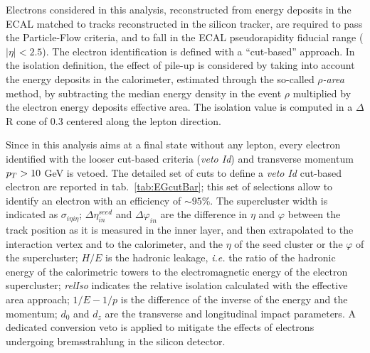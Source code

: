 Electrons considered in this analysis, reconstructed from energy deposits in the ECAL matched to tracks reconstructed in the silicon tracker, are required to pass the Particle-Flow criteria, and to fall in the ECAL pseudorapidity fiducial range ($|\eta|<2.5$). The electron identification is defined with a ``cut-based'' approach. In the isolation definition, the effect of pile-up is considered by taking into account the energy deposits in the calorimeter, estimated through the so-called \emph{$\rho$-area} method, by subtracting the median energy density in the event $\rho$ multiplied by the electron energy deposits effective area. The isolation value is computed in a $\Delta$R cone of 0.3 centered along the lepton direction.

\noindent Since in this analysis aims at a final state without any lepton, every electron identified with the looser cut-based criteria (\emph{veto Id}) and transverse momentum $p_T > 10$ GeV is vetoed. The detailed set of cuts to define a \emph{veto Id} cut-based electron are reported in tab.~\ref{tab:EGcutBar}; this set of selections allow to identify an electron with an efficiency of $\sim 95$\%. The supercluster width is indicated as $\sigma_{i\eta i\eta}$; $\Delta \eta_{in}^{seed}$ and $\Delta \varphi_{in}$ are the difference in $\eta$ and $\varphi$ between the track position as it is measured in the inner layer, and then extrapolated to the interaction vertex and to the calorimeter, and the $\eta$ of the seed cluster or the $\varphi$ of the supercluster; $H/E$ is the hadronic leakage, \textit{i.e.} the ratio of the hadronic energy of the calorimetric towers to the electromagnetic energy of the electron supercluster; \emph{relIso} indicates the relative isolation calculated with the effective area approach; $1/E - 1/p$ is the difference of the inverse of the energy and the momentum; $d_0$ and $d_z$ are the transverse and longitudinal impact parameters. A dedicated conversion veto is applied to mitigate the effects of electrons undergoing bremsstrahlung in the silicon detector.

